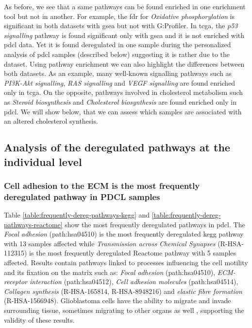 As before, we see that a same pathways can be found enriched in one enrichment tool but not in another.
For example, the \acrshort{fdr} for \textit{Oxidative phosphorylation} is significant in both datasets with \acrshort{gsea} but not with G:Profiler.
In \acrshort{tcga}, the \textit{p53 signalling} pathway is found significant only with \acrshort{gsea} and it is not enriched with \acrshort{pdcl} data.
Yet it is found deregulated in one sample during the personalized analysis of \acrshort{pdcl} samples (described below) suggesting it is rather due to the dataset.
Using pathway enrichment we can also highlight the differences between both datasets.
As an example, many well-known signalling pathways such as \textit{PI3K-Akt signalling}, \textit{RAS signalling} and \textit{VEGF signalling} are found enriched only in \acrshort{tcga}.
On the opposite, pathways involved in cholesterol metabolism such as \textit{Steroid biosynthesis} and \textit{Cholesterol biosynthesis} are found enriched only in \acrshort{pdcl}.
We will show below, that we can assess which samples are associated with an altered cholesterol synthesis.

\subsection{Analysis of the deregulated pathways at the individual level}

\subsubsection{Cell adhesion to the ECM is the most frequently deregulated pathway in PDCL samples}

Table \ref*{table:frequently-dereg-pathways-kegg} and \ref*{table:frequently-dereg-pathways-reactome} show the most frequently deregulated pathways in \acrshort{pdcl}.
The \textit{Focal adhesion} (path:hsa04510) is the most frequently deregulated \acrshort{kegg} pathway with 13 samples affected while \textit{Transmission across Chemical Synapses} (R-HSA-112315) is the most frequently deregulated Reactome pathway with 5 samples affected.
Results contain pathways linked to processes influencing the cell motility and its fixation on the matrix such as: \textit{Focal adhesion} (path:hsa04510), \textit{ECM-receptor interaction} (path:hsa04512), \textit{Cell adhesion molecules} (path:hsa04514), \textit{Collagen synthesis} (R-HSA-165814, R-HSA-8948216) and \textit{elastic fibre formation} (R-HSA-1566948).
Glioblastoma cells have the ability to migrate and invade surrounding tissue, sometimes migrating to other organs as well \cite*{Lah2020}, supporting the validity of these results.

